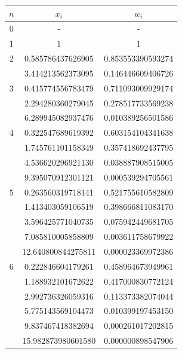 \documentclass[a4paper, 11pt]{article}
\begin{document}
\begin{table}[H]
	\centering
	\begin{tabular}{c | c c}
		$n$ & $x_i$ & $w_i$ \\
		\hline
		0 & - & - \\
		\hline
		1 & 1 & 1 \\
		\hline
		2 & 0.585786437626905 & 0.853553390593274 \\
		  & 3.414213562373095 & 0.146446609406726 \\
		\hline
		3 & 0.415774556783479 & 0.711093009929174 \\
		  & 2.294280360279045 & 0.278517733569238 \\
		  & 6.289945082937476 & 0.010389256501586 \\
		\hline
		4 & 0.322547689619392 &  0.603154104341638 \\
		& 1.745761101158349 &  0.357418692437795\\
		& 4.536620296921130 &  0.038887908515005\\
		& 9.395070912301121 &  0.000539294705561\\
		\hline
		5 & 0.263560319718141 &  0.521755610582809\\
		& 1.413403059106519 &  0.398666811083170\\
		& 3.596425771040735 &  0.075942449681705\\
		& 7.085810005858809 &  0.003611758679922\\
		& 12.640800844275811 &  0.000023369972386\\
		\hline
		6 & 0.222846604179261 &  0.458964673949961\\
		& 1.188932101672622 &  0.417000830772124\\
		& 2.992736326059316 &  0.113373382074044\\
		& 5.775143569104473 &  0.010399197453150\\
		& 9.837467418382694 &  0.000261017202815\\
		& 15.982873980601580 &  0.000000898547906\\
	\end{tabular}
\end{table}
\end{document}

